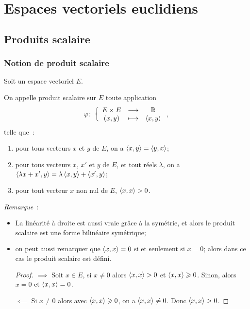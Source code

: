 \chapter{Espaces vectoriels euclidiens}
\label{chap:espaceseuclidiens}
\minitoc
\minilof
\minilot

\section{Produits scalaire}

\subsection{Notion de produit scalaire}

Soit un espace vectoriel \(E\).
\begin{defdef}
  On appelle produit scalaire sur \(E\) toute application
  \begin{equation}
    \varphi\colon \left\{\begin{array}{ccc} E \times E & \longrightarrow &\mathbb{R}\\ (x,y) & \longmapsto & \left\langle{x},{y}\right\rangle \end{array} \right.,
  \end{equation}
  telle que~:
  \begin{enumerate}
  \item pour tous vecteurs \(x\) et \(y\) de \(E\), on a \(\left\langle{x},{y}\right\rangle=\left\langle{y},{x}\right\rangle\);
  \item pour tous vecteurs \(x\), \(x'\) et \(y\) de \(E\), et tout réels \(\lambda\), on a \(\left\langle{\lambda x +x'},{y}\right\rangle = \lambda\left\langle{x},{y}\right\rangle + \left\langle{x'},{y}\right\rangle\);
  \item pour tout vecteur \(x\) non nul de \(E\), \(\left\langle{x},{x}\right\rangle>0\).
  \end{enumerate}
\end{defdef}
\emph{Remarque}~:
\begin{itemize}
\item La linéarité à droite est aussi vraie grâce à la symétrie, et alors le produit scalaire est une forme bilinéaire symétrique;
\item on peut aussi remarquer que \(\left\langle{x},{x}\right\rangle=0\) si et seulement si \(x=0\); alors dans ce cas le produit scalaire est défini.
  \begin{proof}
    \(\implies\) Soit \(x \in E\), si \(x\neq 0\) alors \(\left\langle{x},{x}\right\rangle>0\) et \(\left\langle{x},{x}\right\rangle\geqslant 0\). Sinon, alors \(x=0\) et \(\left\langle{x},{x}\right\rangle=0\).

    \(\impliedby\) Si \(x \neq 0\) alors avec \(\left\langle{x},{x}\right\rangle\geqslant 0\), on a \(\left\langle{x},{x}\right\rangle \neq 0\). Donc \(\left\langle{x},{x}\right\rangle>0\).
  \end{proof}
\end{itemize}

